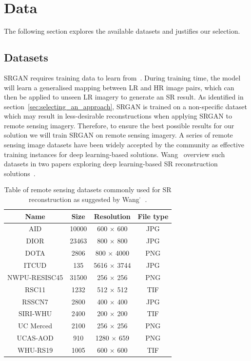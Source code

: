 \section{Data}
The following section explores the available datasets and justifies our selection.

\subsection{Datasets}
SRGAN requires training data to learn from~\cite{srgan}. During training time, the model will learn a generalised mapping between LR and HR image pairs, which can then be applied to unseen LR imagery to generate an SR result. As identified in section~\ref{sec:selecting_an_approach}, SRGAN is trained on a non-specific dataset which may result in less-desirable reconstructions when applying SRGAN to remote sensing imagery. Therefore, to ensure the best possible results for our solution we will train SRGAN on remote sensing imagery. A series of remote sensing image datasets have been widely accepted by the community as effective training instances for deep learning-based solutions. Wang \etal\ overview such datasets in two papers exploring deep learning-based SR reconstruction solutions~\cite{remoteSensingDeepLearningReview, remoteSensingGANsReview}.
\begin{table}
    \centering
    \begin{tabular}{cccc}
        \toprule
        \textbf{Name} & \textbf{Size} & \textbf{Resolution} & \textbf{File type} \\
        \midrule
        AID & 10000 & 600 $\times$ 600 & JPG \\
        DIOR & 23463 & 800 $\times$ 800 & JPG \\
        DOTA & 2806 & 800 $\times$ 4000 & PNG \\
        ITCUD & 135 & 5616 $\times$ 3744 & JPG \\
        NWPU-RESISC45 & 31500 & 256 $\times$ 256 & PNG \\
        RSC11 & 1232 & 512 $\times$ 512 & TIF \\
        RSSCN7 & 2800 & 400 $\times$ 400 & JPG \\
        SIRI-WHU & 2400 & 200 $\times$ 200 & TIF \\
        UC Merced & 2100 & 256 $\times$ 256 & PNG \\
        UCAS-AOD & 910 & 1280 $\times$ 659 & PNG \\
        WHU-RS19 & 1005 & 600 $\times$ 600 & TIF \\
        \bottomrule
    \end{tabular}
    \caption{Table of remote sensing datasets commonly used for SR reconstruction as suggested by Wang \etal\.~\cite{remoteSensingDeepLearningReview,remoteSensingGANsReview}.}
    \label{table:datasets_table}
\end{table}


